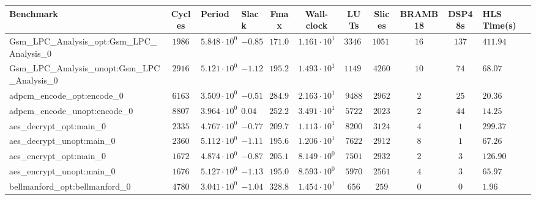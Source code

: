 \begin{tabular}{|l|c|HHc|c|c|c|c|cH|}
\hline
Benchmark                                       & Cycles       & Period                 & Slack     & Fmax       & Wall-clock              & LUTs       & Slices    & BRAMB18 & DSP48s  & HLS Time(s) \\
\hline
Gsm\_LPC\_Analysis\_opt:Gsm\_LPC\_Analysis\_0   & $ 1986     $ & $ 5.848 \cdot 10^{0} $ & $ -0.85 $ & $ 171.00 $ & $ 1.161 \cdot 10^{1}  $ & $ 33466  $ & $ 10517 $ & $ 16  $ & $ 137 $ & $ 411.94  $ \\
Gsm\_LPC\_Analysis\_unopt:Gsm\_LPC\_Analysis\_0 & $ 2916     $ & $ 5.121 \cdot 10^{0} $ & $ -1.12 $ & $ 195.27 $ & $ 1.493 \cdot 10^{1}  $ & $ 11490  $ & $ 4260  $ & $ 10  $ & $ 74  $ & $ 68.07   $ \\
adpcm\_encode\_opt:encode\_0                    & $ 6163     $ & $ 3.509 \cdot 10^{0} $ & $ -0.51 $ & $ 284.98 $ & $ 2.163 \cdot 10^{1}  $ & $ 9488   $ & $ 2962  $ & $ 2   $ & $ 25  $ & $ 20.36   $ \\
adpcm\_encode\_unopt:encode\_0                  & $ 8807     $ & $ 3.964 \cdot 10^{0} $ & $ 0.04  $ & $ 252.27 $ & $ 3.491 \cdot 10^{1}  $ & $ 5722   $ & $ 2023  $ & $ 2   $ & $ 44  $ & $ 14.25   $ \\
aes\_decrypt\_opt:main\_0                       & $ 2335     $ & $ 4.767 \cdot 10^{0} $ & $ -0.77 $ & $ 209.78 $ & $ 1.113 \cdot 10^{1}  $ & $ 8200   $ & $ 3124  $ & $ 4   $ & $ 1   $ & $ 299.37  $ \\
aes\_decrypt\_unopt:main\_0                     & $ 2360     $ & $ 5.112 \cdot 10^{0} $ & $ -1.11 $ & $ 195.62 $ & $ 1.206 \cdot 10^{1}  $ & $ 7622   $ & $ 2912  $ & $ 8   $ & $ 1   $ & $ 67.26   $ \\
aes\_encrypt\_opt:main\_0                       & $ 1672     $ & $ 4.874 \cdot 10^{0} $ & $ -0.87 $ & $ 205.17 $ & $ 8.149 \cdot 10^{0}  $ & $ 7501   $ & $ 2932  $ & $ 2   $ & $ 3   $ & $ 126.90  $ \\
aes\_encrypt\_unopt:main\_0                     & $ 1676     $ & $ 5.127 \cdot 10^{0} $ & $ -1.13 $ & $ 195.05 $ & $ 8.593 \cdot 10^{0}  $ & $ 5970   $ & $ 2561  $ & $ 4   $ & $ 3   $ & $ 65.97   $ \\
bellmanford\_opt:bellmanford\_0                 & $ 4780     $ & $ 3.041 \cdot 10^{0} $ & $ -1.04 $ & $ 328.84 $ & $ 1.454 \cdot 10^{1}  $ & $ 656    $ & $ 259   $ & $ 0   $ & $ 0   $ & $ 1.96    $ \\

\end{tabular}
